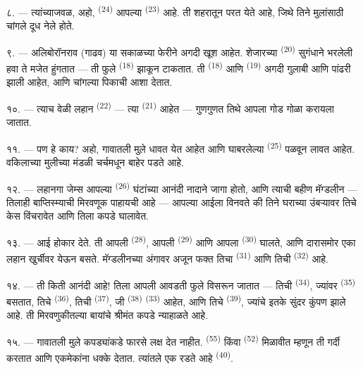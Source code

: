 ८. --- त्यांच्याजवळ, अहो,  \textsuperscript{(24)} आपल्या
 \textsuperscript{(23)} आहे. ती शहरातून परत येते आहे, जिथे तिने
मुलांसाठी चांगले दूध नेले होते.

\VUsaut{4.0mm}
\VUsaut{3.4mm}

९. --- अलिबोरॉनराव (गाढव) या सकाळच्या फेरीने अगदी खूश आहेत. शेजारच्या
  \textsuperscript{(20)} सुगंधाने भरलेली हवा
ते मजेत हुंगतात --- ती फुले  \textsuperscript{(18)} झाकून
टाकतात. ती  \textsuperscript{(18)} आणि 
\textsuperscript{(19)} अगदी गुलाबी आणि पांढरी झाली आहेत, आणि चांगल्या पिकाची आशा
देतात.

१०. --- त्याच वेळी लहान  \textsuperscript{(22)} --- त्या
 \textsuperscript{(21)} आहेत --- गुणगुणत तिथे आपला गोड
 गोळा करायला जातात.

११. --- पण हे काय? अहो, गावातली मुले धावत येत आहेत आणि घाबरलेल्या 
\textsuperscript{(25)} पळवून लावत आहेत. वकिलाच्या मुलीच्या 
मंडळी चर्चमधून बाहेर पडते आहे.

१२. --- लहानगा जेम्स आपल्या  \textsuperscript{(26)} घंटांच्या
आनंदी नादाने जागा होतो, आणि त्याची बहीण मॅग्डलीन --- तिलाही बाप्तिस्म्याची
मिरवणूक पाहायची आहे --- आपल्या आईला विनवते की तिने घराच्या उंबऱ्यावर तिचे केस
विंचरावेत आणि तिला कपडे घालावेत.

१३. --- आई होकार देते. ती आपली  \textsuperscript{(28)}, आपली
 \textsuperscript{(29)} आणि आपला  \textsuperscript{(30)}
घालते, आणि दारासमोर एका लहान खुर्चीवर येऊन बसते. मॅग्डलीनच्या अंगावर अजून फक्त
तिचा  \textsuperscript{(31)} आणि तिची 
\textsuperscript{(32)} आहे.

१४. --- ती किती आनंदी आहे! तिला आपली आवडती फुले विसरून जातात --- तिची
 \textsuperscript{(34)}, ज्यांवर 
\textsuperscript{(35)} बसतात, तिचे  \textsuperscript{(36)}, तिची
 \textsuperscript{(37)}, जी 
\textsuperscript{(38)}  \textsuperscript{(33)} आहेत, आणि तिचे
 \textsuperscript{(39)}, ज्यांचे इतके सुंदर कुंपण झाले आहे. ती
मिरवणुकीतल्या बायांचे श्रीमंत कपडे न्याहाळते आहे.

१५. --- गावातली मुले कपड्यांकडे फारसे लक्ष देत नाहीत. 
\textsuperscript{(55)} किंवा  \textsuperscript{(52)} मिळावीत म्हणून ती
गर्दी करतात आणि एकमेकांना धक्के देतात. त्यांतले एक रडते आहे
\textsuperscript{(40)}.


